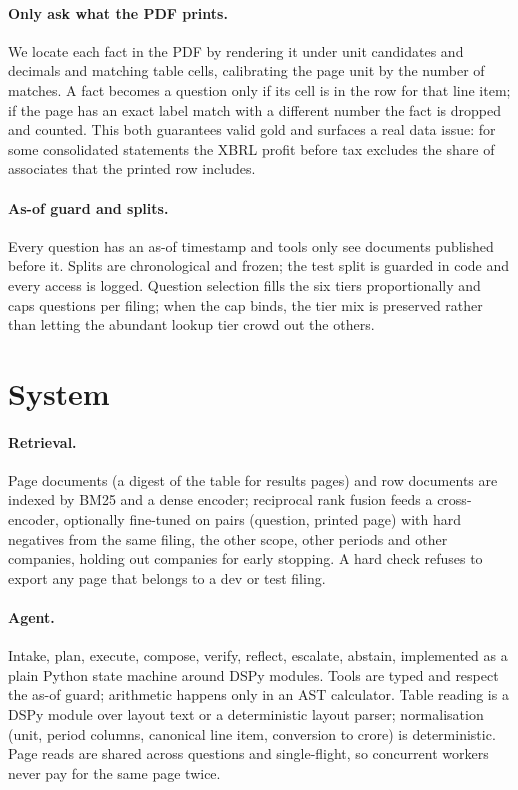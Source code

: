 \documentclass[11pt]{article}
\begin{document}
\paragraph{Only ask what the PDF prints.} We locate each fact in the PDF by rendering it under unit candidates and decimals and matching table cells, calibrating the page unit by the number of matches. A fact becomes a question only if its cell is in the row for that line item; if the page has an exact label match with a different number the fact is dropped and counted. This both guarantees valid gold and surfaces a real data issue: for some consolidated statements the XBRL profit before tax excludes the share of associates that the printed row includes.
\paragraph{As-of guard and splits.} Every question has an as-of timestamp and tools only see documents published before it. Splits are chronological and frozen; the test split is guarded in code and every access is logged. Question selection fills the six tiers proportionally and caps questions per filing; when the cap binds, the tier mix is preserved rather than letting the abundant lookup tier crowd out the others.

\section{System}
\paragraph{Retrieval.} Page documents (a digest of the table for results pages) and row documents are indexed by BM25 and a dense encoder; reciprocal rank fusion feeds a cross-encoder, optionally fine-tuned on pairs (question, printed page) with hard negatives from the same filing, the other scope, other periods and other companies, holding out companies for early stopping. A hard check refuses to export any page that belongs to a dev or test filing.
\paragraph{Agent.} Intake, plan, execute, compose, verify, reflect, escalate, abstain, implemented as a plain Python state machine around DSPy modules. Tools are typed and respect the as-of guard; arithmetic happens only in an AST calculator. Table reading is a DSPy module over layout text or a deterministic layout parser; normalisation (unit, period columns, canonical line item, conversion to crore) is deterministic. Page reads are shared across questions and single-flight, so concurrent workers never pay for the same page twice.
\end{document}
